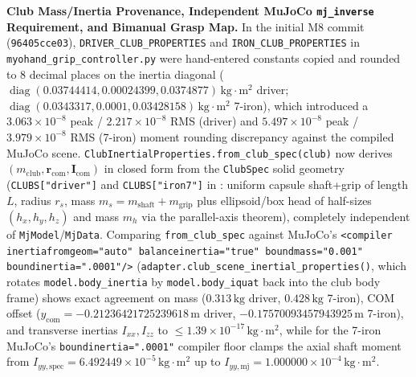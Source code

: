\documentclass[11pt,a4paper]{article}
\begin{document}
\textbf{Club Mass/Inertia Provenance, Independent MuJoCo \texttt{mj\_inverse} Requirement, and Bimanual Grasp Map.}
In the initial M8 commit (\texttt{96405cce03}), \texttt{DRIVER\_CLUB\_PROPERTIES} and \texttt{IRON\_CLUB\_PROPERTIES} in \texttt{myohand\_grip\_controller.py} were hand-entered constants copied and rounded to $8$ decimal places on the inertia diagonal ($\operatorname{diag}(0.03744414, 0.00024399, 0.0374877)\,\mathrm{kg\cdot m^2}$ driver; $\operatorname{diag}(0.0343317, 0.0001, 0.03428158)\,\mathrm{kg\cdot m^2}$ 7-iron), which introduced a $3.063 \times 10^{-8}$ peak / $2.217 \times 10^{-8}$ RMS (driver) and $5.497 \times 10^{-8}$ peak / $3.979 \times 10^{-8}$ RMS (7-iron) moment rounding discrepancy against the compiled MuJoCo scene. \texttt{ClubInertialProperties.from\_club\_spec(club)} now derives $(m_{\mathrm{club}}, \mathbf{r}_{\mathrm{com}}, \mathbf{I}_{\mathrm{com}})$ in closed form from the \texttt{ClubSpec} solid geometry (\texttt{CLUBS["driver"]} and \texttt{CLUBS["iron7"]} in : uniform capsule shaft+grip of length $L$, radius $r_s$, mass $m_s = m_{\mathrm{shaft}} + m_{\mathrm{grip}}$ plus ellipsoid/box head of half-sizes $(h_x, h_y, h_z)$ and mass $m_h$ via the parallel-axis theorem), completely independent of \texttt{MjModel}/\texttt{MjData}. Comparing \texttt{from\_club\_spec} against MuJoCo's \texttt{<compiler inertiafromgeom="auto" balanceinertia="true" boundmass="0.001" boundinertia=".0001"/>} (\texttt{adapter.club\_scene\_inertial\_properties()}, which rotates \texttt{model.body\_inertia} by \texttt{model.body\_iquat} back into the club body frame) shows exact agreement on mass ($0.313\,\mathrm{kg}$ driver, $0.428\,\mathrm{kg}$ 7-iron), COM offset ($y_{\mathrm{com}} = -0.21236421725239618\,\mathrm{m}$ driver, $-0.17570093457943925\,\mathrm{m}$ 7-iron), and transverse inertias $I_{xx}, I_{zz}$ to $\le 1.39 \times 10^{-17}\,\mathrm{kg\cdot m^2}$, while for the 7-iron MuJoCo's \texttt{boundinertia=".0001"} compiler floor clamps the axial shaft moment from $I_{yy,\mathrm{spec}} = 6.492449 \times 10^{-5}\,\mathrm{kg\cdot m^2}$ up to $I_{yy,\mathrm{mj}} = 1.000000 \times 10^{-4}\,\mathrm{kg\cdot m^2}$.
\end{document}
